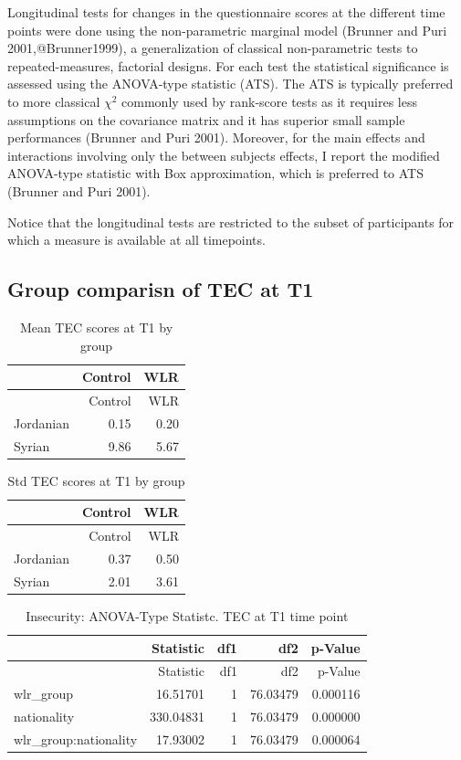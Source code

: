 \documentclass[]{article}
\begin{document}
Longitudinal tests for changes in the questionnaire scores at the
different time points were done using the non-parametric marginal model
(Brunner and Puri 2001,@Brunner1999), a generalization of classical
non-parametric tests to repeated-measures, factorial designs. For each
test the statistical significance is assessed using the ANOVA-type
statistic (ATS). The ATS is typically preferred to more classical
\(\chi^2\) commonly used by rank-score tests as it requires less
assumptions on the covariance matrix and it has superior small sample
performances (Brunner and Puri 2001). Moreover, for the main effects and
interactions involving only the between subjects effects, I report the
modified ANOVA-type statistic with Box approximation, which is preferred
to ATS (Brunner and Puri 2001).

Notice that the longitudinal tests are restricted to the subset of
participants for which a measure is available at all timepoints.

\newpage

\hypertarget{group-comparisn-of-tec-at-t1}{%
\subsection{Group comparisn of TEC at
T1}\label{group-comparisn-of-tec-at-t1}}

\begin{longtable}[]{@{}lrr@{}}
\caption{Mean TEC scores at T1 by group}\tabularnewline
\toprule
& Control & WLR\tabularnewline
\midrule
\endfirsthead
\toprule
& Control & WLR\tabularnewline
\midrule
\endhead
Jordanian & 0.15 & 0.20\tabularnewline
Syrian & 9.86 & 5.67\tabularnewline
\bottomrule
\end{longtable}

\begin{longtable}[]{@{}lrr@{}}
\caption{Std TEC scores at T1 by group}\tabularnewline
\toprule
& Control & WLR\tabularnewline
\midrule
\endfirsthead
\toprule
& Control & WLR\tabularnewline
\midrule
\endhead
Jordanian & 0.37 & 0.50\tabularnewline
Syrian & 2.01 & 3.61\tabularnewline
\bottomrule
\end{longtable}

\begin{longtable}[]{@{}lrrrr@{}}
\caption{Insecurity: ANOVA-Type Statistc. TEC at T1 time
point}\tabularnewline
\toprule
& Statistic & df1 & df2 & p-Value\tabularnewline
\midrule
\endfirsthead
\toprule
& Statistic & df1 & df2 & p-Value\tabularnewline
\midrule
\endhead
wlr\_group & 16.51701 & 1 & 76.03479 & 0.000116\tabularnewline
nationality & 330.04831 & 1 & 76.03479 & 0.000000\tabularnewline
wlr\_group:nationality & 17.93002 & 1 & 76.03479 &
0.000064\tabularnewline
\bottomrule
\end{longtable}
\end{document}
